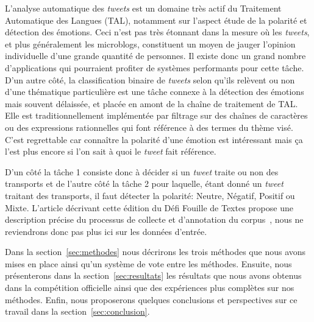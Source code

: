 
L'analyse automatique des \textit{tweets} est un domaine très actif du Traitement Automatique des Langues (TAL), notamment sur l'aspect étude de la polarité et détection des émotions.
Ceci n'est pas très étonnant dans la mesure où les \textit{tweets}, et plus généralement les microblogs, constituent un moyen de jauger l'opinion individuelle d'une grande quantité de personnes.
Il existe donc un grand nombre d'applications qui pourraient profiter de systèmes performants pour cette tâche.
D'un autre côté, la classification binaire de \textit{tweets} selon qu'ils relèvent ou non d'une thématique particulière est une tâche connexe à la détection des émotions mais souvent délaissée, et placée en amont de la chaîne de traitement de {TAL}.
Elle est traditionnellement implémentée par filtrage sur des chaînes de caractères ou des expressions rationnelles qui font référence à des termes du thème visé.
C'est regrettable car connaître la polarité d'une émotion est intéressant mais ça l'est plus encore si l'on sait à quoi le \textit{tweet} fait référence.

D'un côté la tâche 1 consiste donc à décider si un \textit{tweet} traite ou non des transports et de l'autre côté la tâche 2 pour laquelle, étant donné un \textit{tweet} traitant des transports, il faut détecter la polarité: Neutre, Négatif, Positif ou Mixte.
L'article décrivant cette édition du Défi Fouille de Textes propose une description précise du processus de collecte et d'annotation du corpus~\cite{Paroubek-2018}, nous ne reviendrons donc pas plus ici sur les données d'entrée.

Dans la section~\ref{sec:methodes} nous décrirons les trois méthodes que nous avons mises en place ainsi qu'un système de vote entre les méthodes.
Ensuite, nous présenterons dans la section~\ref{sec:resultats} les résultats que nous avons obtenus dans la compétition officielle ainsi que des expériences plus complètes sur nos méthodes.
Enfin, nous proposerons quelques conclusions et perspectives sur ce travail dans la section~\ref{sec:conclusion}.

